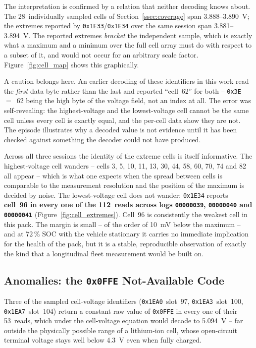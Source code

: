\documentclass[11pt,a4paper,oneside,parskip=half]{scrreprt}
\providecommand{\hex}{}\renewcommand{\hex}[1]{\texttt{0x#1}}
\begin{document}
The interpretation is confirmed by a relation that neither decoding knows about. The 28~individually sampled cells of Section~\ref{ssec:coverage} span 3.888--3.890~V; the extremes reported by \hex{1E33}/\hex{1E34} over the same session span 3.881--3.894~V. The reported extremes \emph{bracket} the independent sample, which is exactly what a maximum and a minimum over the full cell array must do with respect to a subset of it, and would not occur for an arbitrary scale factor. Figure~\ref{fig:cell_map} shows this graphically.

A caution belongs here. An earlier decoding of these identifiers in this work read the \emph{first} data byte rather than the last and reported ``cell~62'' for both -- \hex{3E}~$=$~62 being the high byte of the voltage field, not an index at all. The error was self-revealing: the highest-voltage and the lowest-voltage cell cannot be the same cell unless every cell is exactly equal, and the per-cell data show they are not. The episode illustrates why a decoded value is not evidence until it has been checked against something the decoder could not have produced.

Across all three sessions the identity of the extreme cells is itself informative. The highest-voltage cell wanders -- cells 3, 5, 10, 11, 13, 30, 44, 58, 60, 70, 74 and 82 all appear -- which is what one expects when the spread between cells is comparable to the measurement resolution and the position of the maximum is decided by noise. The lowest-voltage cell does not wander: \hex{1E34} reports \textbf{cell~96 in every one of the 112~reads across logs \texttt{00000039}, \texttt{00000040} and \texttt{00000041}} (Figure~\ref{fig:cell_extremes}). Cell~96 is consistently the weakest cell in this pack. The margin is small -- of the order of 10~mV below the maximum -- and at 72\,\% SOC with the vehicle stationary it carries no immediate implication for the health of the pack, but it is a stable, reproducible observation of exactly the kind that a longitudinal fleet measurement would be built on.

\subsection{Anomalies: the \hex{0FFE} Not-Available Code}
\label{ssec:anomalies}
Three of the sampled cell-voltage identifiers (\hex{1EA0}~slot~97, \hex{1EA3}~slot~100, \hex{1EA7}~slot~104) return a constant raw value of \hex{0FFE} in every one of their 53~reads, which under the cell-voltage equation would decode to 5.094~V -- far outside the physically possible range of a lithium-ion cell, whose open-circuit terminal voltage stays well below 4.3~V even when fully charged.
\end{document}
